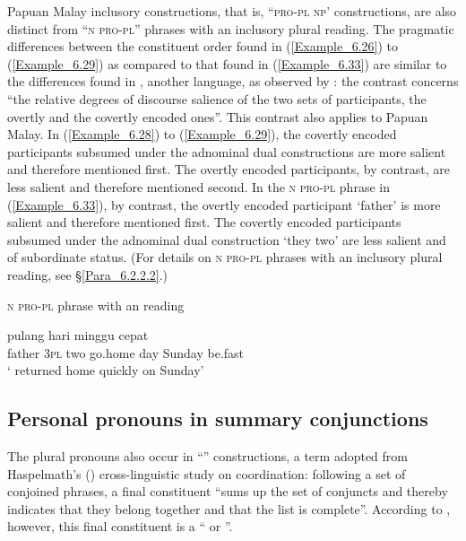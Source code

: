 Papuan Malay inclusory  constructions, that is, ``\textsc{pro-pl}  \textsc{np}’ constructions, are also distinct from ``\textsc{n} \textsc{pro-pl}''  phrases with an  inclusory plural reading. The pragmatic differences between the constituent order found in (\ref{Example_6.26}) to (\ref{Example_6.29}) as compared to that found in (\ref{Example_6.33}) are similar to the differences found in , another  language, as observed by \citet[27]{Lichtenberk.2000}: the contrast concerns “the relative degrees of discourse salience of the two sets of participants, the overtly and the covertly encoded ones”. This contrast also applies to Papuan Malay. In (\ref{Example_6.28}) to (\ref{Example_6.29}), the covertly encoded participants subsumed under the adnominal dual constructions are more salient and therefore mentioned first. The overtly encoded participants, by contrast, are less salient and therefore mentioned second. In the \textsc{n} \textsc{pro-pl}  phrase in (\ref{Example_6.33}), by contrast, the overtly encoded participant  ‘father’ is more salient and therefore mentioned first. The covertly encoded participants subsumed under the adnominal dual construction  ‘they two’ are less salient and of subordinate status. (For details on \textsc{n} \textsc{pro-pl}  phrases with an  inclusory plural reading, see §\ref{Para_6.2.2.2}.)



\begin{styleExampleTitle}
\textsc{n} \textsc{pro-pl}  phrase with an  reading
\end{styleExampleTitle}

\ea
\label{Example_6.33}
 {} {} {pulang} {hari} {minggu} {cepat}\\ %
 father  \textsc{3pl}  two  go.home  day  Sunday  be.fast\\
\glt
‘ returned home quickly on Sunday’ \textstyleExampleSource{[080925-003-Cv.0163]}
\z


\subsection{Personal pronouns in summary conjunctions}
\label{Para_6.1.5}
The plural pronouns also occur in “” constructions, a term adopted from Haspelmath's (\citeyear*[36]{Haspelmath.2007c}) cross-linguistic study on coordination: following a set of conjoined  phrases, a final constituent “sums up the set of conjuncts and thereby indicates that they belong together and that the list is complete”. According to \citet[36]{Haspelmath.2007c}, however, this final constituent is a “ or ”.



